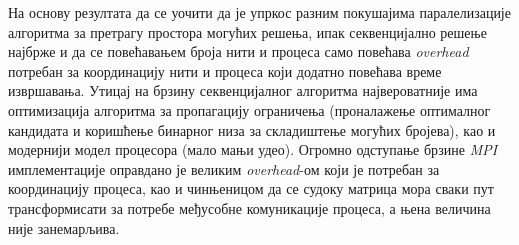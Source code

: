 На основу резултата да се уочити да је упркос разним покушајима паралелизације алгоритма за претрагу простора могућих решења, ипак секвенцијално решење најбрже и да се повећавањем броја нити и процеса само повећава \textit{overhead} потребан за координацију нити и процеса који додатно повећава време извршавања. Утицај на брзину секвенцијалног алгоритма највероватније има оптимизација алгоритма за пропагацију ограничења (проналажење оптималног кандидата и коришћење бинарног низа за складиштење могућих бројева), као и модернији модел процесора (мало мањи удео). Огромно одступање брзине \textit{MPI} имплементације оправдано је великим \textit{overhead}-ом који је потребан за координацију процеса, као и чинњеницом да се судоку матрица мора сваки пут трансформисати за потребе међусобне комуникације процеса, а њена величина није занемарљива.
